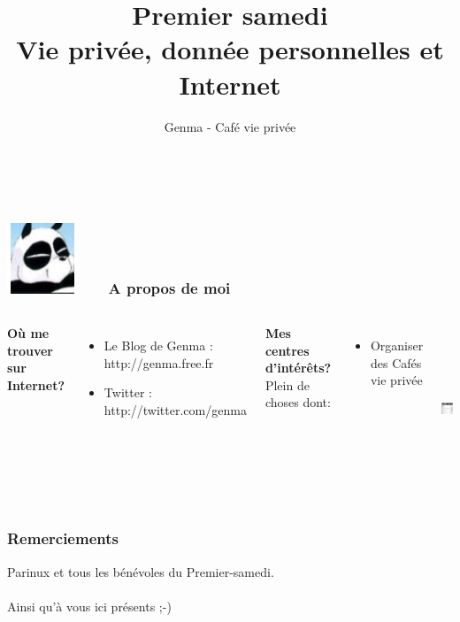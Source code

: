 \documentclass{beamer}
\title[]{Premier samedi \\ Vie privée, donnée personnelles et Internet}
\author{Genma - Café vie privée}
\begin{document}
\begin{frame}
	\titlepage
	\vfill
	\begin{center}
		\\[2.5ex]
		{\tiny\CcNote{\CcLongnameByNcSa}}
		\vspace*{-2.5ex}
	\end{center}
\end{frame}

\begin{frame}
\frametitle{\includegraphics[scale=0.4]{./images/Genma.jpg} \ \ \  A propos de moi  }
\begin{columns}[c] 

\textbf{Où me trouver sur Internet?}
\begin{itemize}
\item Le Blog de Genma : http://genma.free.fr
\item Twitter : http://twitter.com/genma
\end{itemize}
\textbf{Mes centres d'intérêts?}
\\ Plein de choses dont:
\begin{itemize}
\item Organiser des Cafés vie privée
\end{itemize}
\includegraphics[width=5cm,height=5cm]{./images/blog.png} 
\end{columns}
\end{frame}

\begin{frame}
\frametitle{Remerciements}
Parinux et tous les bénévoles du Premier-samedi. 
\\~\\
Ainsi qu'à vous ici présents ;-)
\end{frame}
\end{document}
